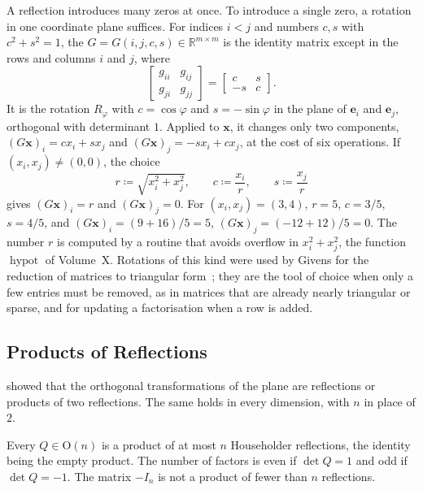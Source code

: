 A reflection introduces many zeros at once. To introduce a single zero, a rotation in one coordinate plane suffices. For indices $i<j$ and numbers $c,s$ with $c^2+s^2=1$, the  $G=G(i,j,c,s)\in\mathbb R^{m\times m}$ is the identity matrix except in the rows and columns $i$ and $j$, where
\[
\begin{bmatrix}g_{ii}&g_{ij}\\g_{ji}&g_{jj}\end{bmatrix}=\begin{bmatrix}c&s\\-s&c\end{bmatrix}.
\]
It is the rotation $R_\varphi$ with $c=\cos\varphi$ and $s=-\sin\varphi$ in the plane of $\mathbf e_i$ and $\mathbf e_j$, orthogonal with determinant $1$. Applied to $\mathbf x$, it changes only two components, $(G\mathbf x)_i=cx_i+sx_j$ and $(G\mathbf x)_j=-sx_i+cx_j$, at the cost of six operations. If $(x_i,x_j)\ne(0,0)$, the choice
\[
r\coloneqq\sqrt{x_i^2+x_j^2},\qquad c\coloneqq\frac{x_i}r,\qquad s\coloneqq\frac{x_j}r
\]
gives $(G\mathbf x)_i=r$ and $(G\mathbf x)_j=0$. For $(x_i,x_j)=(3,4)$, $r=5$, $c=3/5$, $s=4/5$, and $(G\mathbf x)_i=(9+16)/5=5$, $(G\mathbf x)_j=(-12+12)/5=0$. The number $r$ is computed by a routine that avoids overflow in $x_i^2+x_j^2$, the function $\operatorname{hypot}$ of Volume~X. Rotations of this kind were used by Givens for the reduction of matrices to triangular form~\cite{givens1958}; they are the tool of choice when only a few entries must be removed, as in matrices that are already nearly triangular or sparse, and for updating a factorisation when a row is added.

\subsection{Products of Reflections}

 showed that the orthogonal transformations of the plane are reflections or products of two reflections. The same holds in every dimension, with $n$ in place of $2$.

\begin{theorem}
\label{thm:reflections-product}
Every $Q\in\mathrm O(n)$ is a product of at most $n$ Householder reflections, the identity being the empty product. The number of factors is even if $\det Q=1$ and odd if $\det Q=-1$. The matrix $-I_n$ is not a product of fewer than $n$ reflections.
\end{theorem}

